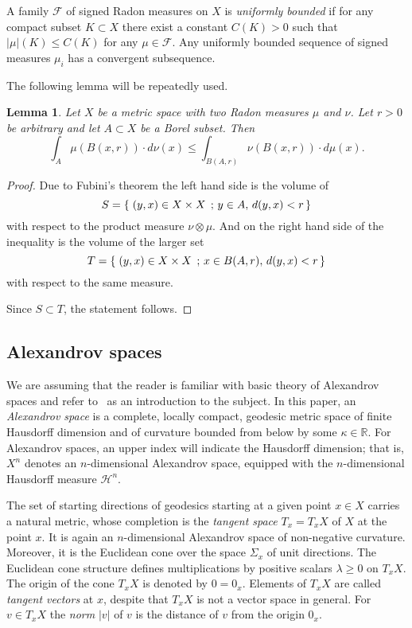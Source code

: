 \documentclass[12pt,leqno,intlimits]{amsart}
\numberwithin{equation}{section}
\newtheorem{lem}[thm]{Lemma}
\theoremstyle{definition}
\theoremstyle{remark}
\newcommand{\R}{\mathbb{R}}
\newcommand*{\set}[2]{\left\{\,\left.{#1}\vphantom{#2}\,\right.;\,{#2}\,\right\}}
\begin{document}
A family $\mathcal F$ of signed Radon measures on $X$ is \emph{uniformly bounded} if for any compact subset $K\subset X$ there exist a constant $C(K)>0$ such that $|\mu| (K) \leq C(K)$ for any $\mu \in \mathcal F$.
Any uniformly bounded sequence of signed measures $\mu _i$ has a convergent subsequence.

The following lemma will be repeatedly used.

\begin{lem} \label{lem:exchange}
Let $X$ be a metric space with two Radon measures $\mu $ and $\nu$. Let $r>0$ be arbitrary and let $A\subset X$ be a Borel subset. Then
$$\int _A \mu (B(x,r)) \cdot d\nu (x) \leq \int _{B (A,r)} \nu (B (x,r)) \cdot d\mu (x).$$
\end{lem}

\begin{proof} Due to Fubini's theorem
the left hand side is the volume of
$$S=\set{(y,x) \in X\times X}{y \in A,\, d(y,x) <r}$$
with respect to the product measure $\nu \otimes \mu$. %
And on the right hand side of the inequality is the volume of the larger set
$$T=\set{(y,x) \in X\times X}{x\in B(A,r), \, d(y,x)<r}$$
with respect to the same measure.

Since $S\subset T$, the statement follows.
\end{proof}

\subsection{Alexandrov spaces} \label{subsec:Alex}
We are assuming that the reader is familiar with basic theory of Alexandrov spaces and refer to~\cite{BGP} as an introduction to the subject.
In this paper, an \emph{Alexandrov space} is a complete, locally compact, geodesic metric space of finite Hausdorff dimension and of curvature bounded from below by some $\kappa \in \R$.
For Alexandrov spaces, an upper index will indicate the Hausdorff dimension; that is, $X^n$ denotes an $n$-dimensional Alexandrov space, equipped with the $n$-dimensional Hausdorff measure $\mathcal H^n$.

The set of starting directions of geodesics starting at a given point $x\in X$ carries a natural metric, whose completion is the \emph{tangent space} $T_x=T_xX$
of $X$ at the point $x$. It is again an $n$-dimensional Alexandrov space of non-negative curvature. Moreover, it is the Euclidean cone
over the space $\Sigma _x$ of unit directions. The Euclidean cone structure defines multiplications by positive scalars $\lambda \geq 0$ on $T_xX$. The origin
of the cone $T_xX$ is denoted by $0=0_x$.
Elements of $T_xX$ are called \emph{tangent vectors} at $x$, despite that $T_xX$ is not a vector space in general.
For $v\in T_xX$ the \emph{norm} $|v|$ of $v$ is the distance of $v$ from the origin $0_x$.
\end{document}
